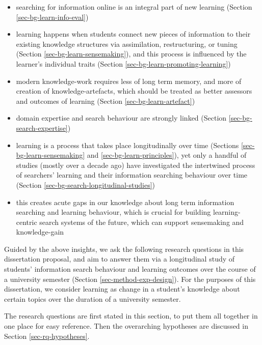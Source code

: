 \documentclass[letterpaper, nobind]{templates/ociamthesis}
\providecommand{\tightlist}{%
  \setlength{\itemsep}{0pt}\setlength{\parskip}{0pt}}
\begin{document}
\begin{itemize}
\tightlist
\item
  searching for information online is an integral part of new learning (Section \ref{sec-bg-learn-info-eval})
\item
  learning happens when students connect new pieces of information to their existing knowledge structures via assimilation, restructuring, or tuning (Section \ref{sec-bg-learn-sensemaking}), and this process is influenced by the learner's individual traits (Section \ref{sec-bg-learn-promoting-learning})
\item
  modern knowledge-work requires less of long term memory, and more of creation of knowledge-artefacts, which should be treated as better assessors and outcomes of learning (Section \ref{sec-bg-learn-artefact})
\item
  domain expertise and search behaviour are strongly linked (Section \ref{sec-bg-search-expertise})
\item
  learning is a process that takes place longitudinally over time (Sections \ref{sec-bg-learn-sensemaking} and \ref{sec-bg-learn-principles}), yet only a handful of studies (mostly over a decade ago) have investigated the intertwined process of searchers' learning and their information searching behaviour over time (Section \ref{sec-bg-search-longitudinal-studies})
\item
  this creates acute gaps in our knowledge about long term information searching and learning behaviour, which is crucial for building learning-centric search systems of the future, which can support sensemaking and knowledge-gain
\end{itemize}

Guided by the above insights, we ask the following research questions in this dissertation proposal, and aim to answer them via a longitudinal study of students' information search behaviour and learning outcomes over the course of a university semester (Section \ref{sec-method-exp-design}). For the purposes of this
dissertation, we consider learning as change in a student's knowledge
about certain topics over the duration of a university semester.

The research questions are first stated in this section, to put them all
together in one place for easy reference. Then the overarching
hypotheses are discussed in Section \ref{sec-rq-hypotheses}.
\end{document}
